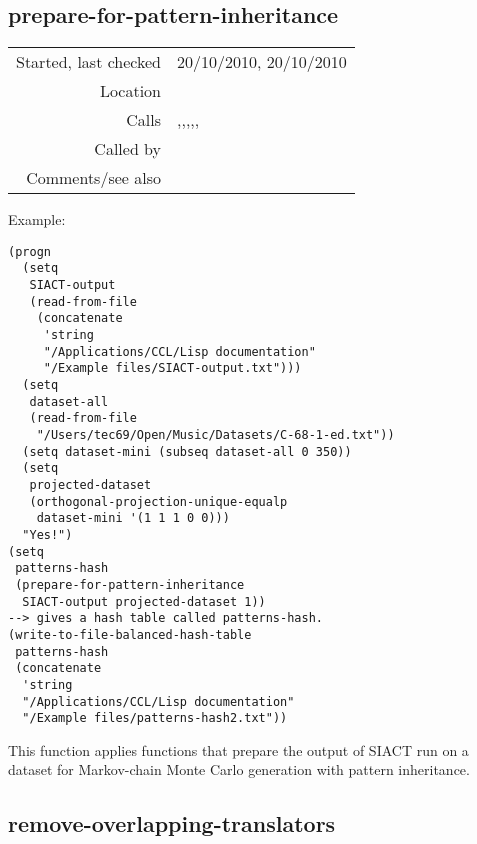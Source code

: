 \subsection*{prepare-for-pattern-inheritance}\label{fun:prepare-for-pattern-inheritance}

\vspace{0.3cm}
\begin{tabular}{r|p{8cm}}
Started, last checked & 20/10/2010, 20/10/2010 \\
Location & \nameref{sec:pattern-inheritance-preliminaries} \\
Calls & \nameref{fun:evaluate-variables-of-patterns2hash},\newline \nameref{fun:remove-overlapping-translators-of-patterns},\newline \nameref{fun:remove-patterns-equalp-transnintersect},\newline \nameref{fun:remove-patterns-shorter-than},\newline \nameref{fun:subset-scores-of-patterns+},\newline \nameref{fun:translate-patterns-to-1st-occurrences} \\
Called by & \\
Comments/see also & 
\end{tabular}

\vspace{0.5cm}
\noindent Example:
\begin{verbatim}
(progn
  (setq
   SIACT-output
   (read-from-file
    (concatenate
     'string
     "/Applications/CCL/Lisp documentation"
     "/Example files/SIACT-output.txt")))
  (setq
   dataset-all
   (read-from-file
    "/Users/tec69/Open/Music/Datasets/C-68-1-ed.txt"))
  (setq dataset-mini (subseq dataset-all 0 350))
  (setq
   projected-dataset
   (orthogonal-projection-unique-equalp
    dataset-mini '(1 1 1 0 0)))
  "Yes!")
(setq
 patterns-hash
 (prepare-for-pattern-inheritance
  SIACT-output projected-dataset 1))
--> gives a hash table called patterns-hash.
(write-to-file-balanced-hash-table
 patterns-hash
 (concatenate
  'string
  "/Applications/CCL/Lisp documentation"
  "/Example files/patterns-hash2.txt"))
\end{verbatim}

\noindent This function applies functions that
prepare the output of SIACT run on a dataset for
Markov-chain Monte Carlo generation with pattern
inheritance.


\subsection*{remove-overlapping-translators}\label{fun:remove-overlapping-translators}

